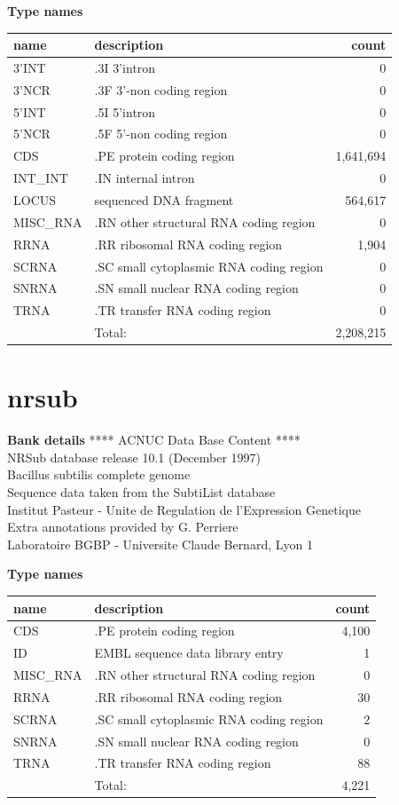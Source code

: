 \documentclass{article}
\begin{document}
\begin{Schunk}
\textbf{Type names}
\noindent\begin{tabular}{llr}
\hline \hline
name & description & count \\
\hline
3'INT  &  .3I 3'intron  &  0 \\
3'NCR  &  .3F  3'-non coding region  &  0 \\
5'INT  &  .5I 5'intron  &  0 \\
5'NCR  &  .5F  5'-non coding region  &  0 \\
CDS  &  .PE protein coding region  &  1,641,694 \\
INT\_INT  &  .IN  internal intron  &  0 \\
LOCUS  &  sequenced DNA fragment  &  564,617 \\
MISC\_RNA  &  .RN other structural RNA coding region  &  0 \\
RRNA  &  .RR ribosomal RNA coding region  &  1,904 \\
SCRNA  &  .SC small cytoplasmic RNA coding region  &  0 \\
SNRNA  &  .SN small nuclear RNA coding region  &  0 \\
TRNA  &  .TR transfer RNA coding region  &  0 \\
\hline
 & Total: & 2,208,215 \\
\hline \hline
\end{tabular}

\section{ nrsub }
\textbf{Bank details}
               ****     ACNUC Data Base Content      ****\\
               NRSub database release 10.1 (December 1997)\\
                    Bacillus subtilis complete genome\\
             Sequence data taken from the SubtiList database\\
     Institut Pasteur - Unite de Regulation de l'Expression Genetique\\
                Extra annotations provided by G. Perriere\\
           Laboratoire BGBP - Universite Claude Bernard, Lyon 1

\textbf{Type names}
\noindent\begin{tabular}{llr}
\hline \hline
name & description & count \\
\hline
CDS  &  .PE protein coding region  &  4,100 \\
ID  &  EMBL sequence data library entry  &  1 \\
MISC\_RNA  &  .RN other structural RNA coding region  &  0 \\
RRNA  &  .RR ribosomal RNA coding region  &  30 \\
SCRNA  &  .SC small cytoplasmic RNA coding region  &  2 \\
SNRNA  &  .SN small nuclear RNA coding region  &  0 \\
TRNA  &  .TR transfer RNA coding region  &  88 \\
\hline
 & Total: & 4,221 \\
\hline \hline
\end{tabular}


\end{Schunk}
\end{document}
